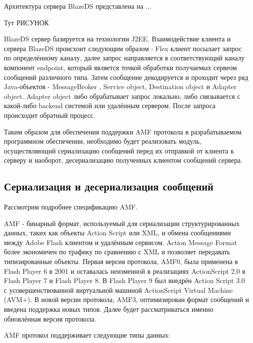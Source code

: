 Архитектура сервера BlazeDS представлена на ...

Тут  РИСУНОК

BlazeDS сервер базируется на технологии J2EE. Взаимодействие клиента и сервера BlazeDS происхоит следующим 
образом : Flex клиент посылает запрос по определённому каналу, далее запрос направляется в соответствующий каналу 
компонент endpoint, который является точкой обработки получаемых сервеом сообщений различного типа. Затем сообщение 
декодируется и проходит через ряд Java-объектов - MessageBroker , Service object, Destination object и Adapter object.
 Adapter object либо обрабатывает запрос локально, либо связывается с какой-либо backend системой или 
 удалённым сервером. После запроса происходит обратный процесс.
 
Таким образом для обеспечения поддержки AMF протокола в разрабатываемом программном 
обеспечении, необходимо будет реализовать модуль, осуществляющий сериализацию сообщений 
перед их отправкой от клиента к серверу и наоборот, десериализацию полученных клиентом сообщений 
сервера.

\subsection{Сериализация и десериализация сообщений}

Рассмотрим подробнее спецификацию AMF.

AMF - бинарный формат, используемый для сериализации структурированных данных, таких как объекты Action Script или 
XML, и обмена сообщениями между Adobe Flash клиентом и удалённым сервисом. Action Message Format более экономичен 
по трафику по сравнению с XML и позволяет передавать типизированные объекты. Первая версия протокола, AMF0, была 
применена в Flash Player 6 в 2001 и оставалась неизменной в реализациях ActionScript 2.0 в Flash Player 7 и Flash 
Player 8. В Flash Player 9 был внедрён Action Script 3.0 с усовершенствованной виртуальной машиной 
ActionScript Virtual Machine (AVM+). В новой версии протокола, AMF3, оптимизирован формат сообщений и введена 
поддержка новых типов. Далее будет рассматриваться именно обновлённая версия протокола.

AMF протокол поддерживает следующие типы данных:

